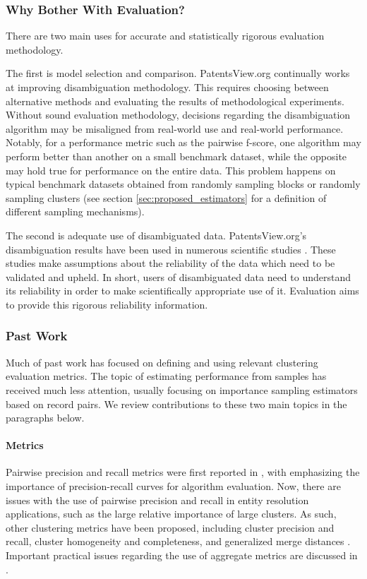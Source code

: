\documentclass[fontsize=11pt]{article}
\theoremstyle{definition}
\begin{document}
\subsubsection{Why Bother With Evaluation?}

There are two main uses for accurate and statistically rigorous evaluation methodology.

The first is model selection and comparison. PatentsView.org continually works at improving disambiguation methodology. This requires choosing between alternative methods and evaluating the results of methodological experiments. Without sound evaluation methodology, decisions regarding the disambiguation algorithm may be misaligned from real-world use and real-world performance. Notably, for a performance metric such as the pairwise f-score, one algorithm may perform better than another on a small benchmark dataset, while the opposite may hold true for performance on the entire data. This problem happens on typical benchmark datasets obtained from randomly sampling blocks or randomly sampling clusters (see section \ref{sec:proposed_estimators} for a definition of different sampling mechanisms).

The second is adequate use of disambiguated data. PatentsView.org's disambiguation results have been used in numerous scientific studies \citep{toole2021patentsview}. These studies make assumptions about the reliability of the data which need to be validated and upheld. In short, users of disambiguated data need to understand its reliability in order to make scientifically appropriate use of it. Evaluation aims to provide this rigorous reliability information.

\subsubsection{Past Work}

Much of past work has focused on defining and using relevant clustering evaluation metrics. The topic of estimating performance from samples has received much less attention, usually focusing on importance sampling estimators based on record pairs. We review contributions to these two main topics in the paragraphs below.

\paragraph{Metrics}

Pairwise precision and recall metrics were first reported in \cite{Newcombe1959}, with \cite{Bilenko2003, Christen2007} emphasizing the importance of precision-recall curves for algorithm evaluation. Now, there are issues with the use of pairwise precision and recall in entity resolution applications, such as the large relative importance of large clusters. As such, other clustering metrics have been proposed, including cluster precision and recall, cluster homogeneity and completeness, and generalized merge distances \citep{Michelson2009, Menestrina2010, Maidasani2012, Barnes2015}. Important practical issues regarding the use of aggregate metrics are discussed in \cite{Hand2018}.
\end{document}
